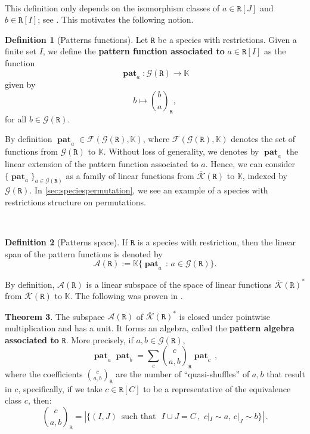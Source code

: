 \documentclass[12pt, reqno]{amsart}
\theoremstyle{definition}
\newtheorem{thm}{Theorem}[section]
\newtheorem{defin}[thm]{Definition}
\DeclareMathOperator{\pat}{\mathbf{pat}}
\newcommand{\prR}{\mathtt{R}}
\newcommand{\Kc}{\mathcal{K}}
\newcommand{\Kcb}{\overline{\Kc}}
\begin{document}
\

This definition only depends on the isomorphism classes of $a \in \prR[J]$ and $b \in \prR[I]$; see \cite{Penaguiao2020}. This motivates the following notion.

\begin{defin}[Patterns functions]\label{defin:pattern}
Let $\prR$ be a species with restrictions. Given a finite set $I$, we define the {\bf pattern function associated to} $a \in \prR[I]$ as the function
\[\pat_a: \mathcal{G}(\prR) \to \mathbb{K} \]
given by
\begin{equation}
    b \mapsto \binom{b}{a}_{\!\prR},
\end{equation}
for all $b \in \mathcal{G}(\prR)$.
\end{defin}

By definition $\pat_a \in \mathcal{F}(\mathcal{G}(\prR), \mathbb{K})$, where $\mathcal{F}(\mathcal{G}(\prR), \mathbb{K})$ denotes the set of functions from $\mathcal{G}(\prR)$ to $\mathbb{K}$. Without loss of generality, we denotes by $\pat_a$ the linear extension of the pattern function associated to $a$. Hence, we can consider $\{ \pat_a \}_{a\in \mathcal{G}(\prR)}$ as a family of linear functions from $\Kcb(\prR)$ to $\mathbb{K}$, indexed by $\mathcal{G}(\prR)$.
In \cref{sec:speciespermutation}, we see an example of a species with restrictions structure on permutations.

\

\begin{defin}[Patterns space]
If $\prR$ is a species with restriction, then the linear span of the pattern functions is denoted by
\begin{equation}
    \mathcal{A}(\prR):=\mathbb{K}\{\pat_a \, : \, a\in \mathcal{G}(\prR)\}.
\end{equation}
\end{defin}

By definition, $\mathcal{A}(\prR)$ is a linear subspace of the space of linear functions $\Kcb(\prR)^*$ from $\Kcb(\prR)$ to $\mathbb{K}$. The following was proven in \cite{Penaguiao2020}.

\begin{thm}
The subspace $\mathcal{A}(\prR)$ of $\Kcb(\prR)^*$ is closed under pointwise multiplication and has a unit.
It forms an algebra, called the {\bf pattern algebra associated to} $\prR$.
More precisely, if $a, b \in \mathcal G(\prR)$,
\begin{equation}\label{eq:prodrule}
\pat_ a   \pat_b = \sum_c \binom{c}{a, b}_{\! \prR} \pat_c \, ,
\end{equation}
where the coefficients $\binom{c}{a, b}_{\!\prR}$ are the number of ``quasi-shuffles'' of $a, b$ that result in $c$, specifically, if we take $c\in \prR[C]$ to be a representative of the equivalence class $c$, then:
$$ \binom{c}{a, b}_{\!\prR} = \left| \{(I, J) \, \text{ such that } \, \,  I \cup J = C \, ,\, \, c|_{I} \sim a, \, c|_{J} \sim b \} \right| \, .  $$
\end{thm} 
\end{document}

